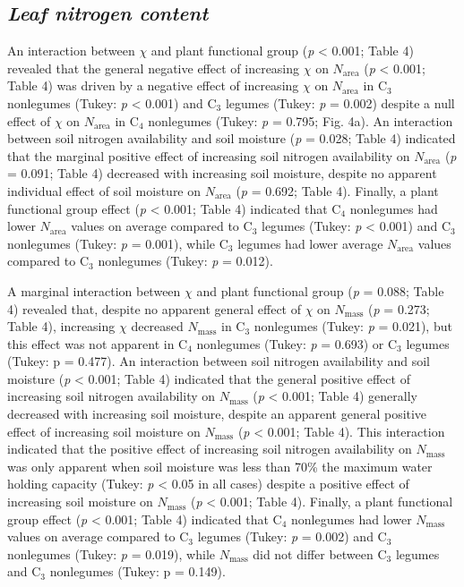 \subsection{\textit{Leaf nitrogen content}}
An interaction between $\chi$ and plant functional group (\textit{p} < 0.001; Table 4) revealed that the general negative effect of increasing $\chi$ on $N_\mathrm{area}$ (\textit{p} < 0.001; Table 4) was driven by a negative effect of increasing $\chi$ on $N_\mathrm{area}$ in C$_3$ nonlegumes (Tukey: \textit{p} < 0.001) and C$_3$ legumes (Tukey: \textit{p} = 0.002) despite a null effect of $\chi$ on $N_\mathrm{area}$ in C$_4$ nonlegumes (Tukey: \textit{p} = 0.795; Fig. 4a). An interaction between soil nitrogen availability and soil moisture (\textit{p} = 0.028; Table 4) indicated that the marginal positive effect of increasing soil nitrogen availability on $N_\mathrm{area}$ (\textit{p} = 0.091; Table 4) decreased with increasing soil moisture, despite no apparent individual effect of soil moisture on $N_\mathrm{area}$ (\textit{p} = 0.692; Table 4). Finally, a plant functional group effect (\textit{p} < 0.001; Table 4) indicated that C$_4$ nonlegumes had lower $N_\mathrm{area}$ values on average compared to C$_3$ legumes (Tukey: \textit{p} < 0.001) and C$_3$ nonlegumes (Tukey: \textit{p} = 0.001), while C$_3$ legumes had lower average $N_\mathrm{area}$ values compared to C$_3$ nonlegumes (Tukey: \textit{p} = 0.012).

A marginal interaction between $\chi$ and plant functional group (\textit{p} = 0.088; Table 4) revealed that, despite no apparent general effect of $\chi$ on $N_\mathrm{mass}$ (\textit{p} = 0.273; Table 4), increasing $\chi$ decreased $N_\mathrm{mass}$ in C$_3$ nonlegumes (Tukey: \textit{p} = 0.021), but this effect was not apparent in C$_4$ nonlegumes (Tukey: \textit{p} = 0.693) or C$_3$ legumes (Tukey: p = 0.477). An interaction between soil nitrogen availability and soil moisture (\textit{p} < 0.001; Table 4) indicated that the general positive effect of increasing soil nitrogen availability on $N_\mathrm{mass}$ (\textit{p} < 0.001; Table 4) generally decreased with increasing soil moisture, despite an apparent general positive effect of increasing soil moisture on $N_\mathrm{mass}$ (\textit{p} < 0.001; Table 4). This interaction indicated that the positive effect of increasing soil nitrogen availability on $N_\mathrm{mass}$ was only apparent when soil moisture was less than 70\% the maximum water holding capacity (Tukey: \textit{p} < 0.05 in all cases) despite a positive effect of increasing soil moisture on $N_\mathrm{mass}$ (\textit{p} < 0.001; Table 4). Finally, a plant functional group effect (\textit{p} < 0.001; Table 4) indicated that C$_4$ nonlegumes had lower $N_\mathrm{mass}$ values on average compared to C$_3$ legumes (Tukey: \textit{p} = 0.002) and C$_3$ nonlegumes (Tukey: \textit{p} = 0.019), while $N_\mathrm{mass}$ did not differ between C$_3$ legumes and C$_3$ nonlegumes (Tukey: p = 0.149).


